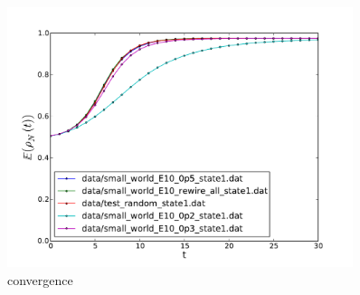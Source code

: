 \documentclass[]{article}
\begin{document}

\begin{figure}
\includegraphics[width=0.9\textwidth]{number_of_edges20.pdf}
\caption{convergence}
\label{fig:fig:conv}
\end{figure}

\newpage{}




\end{document}
